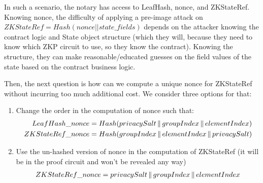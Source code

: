 In such a scenario, the notary has access to LeafHash, nonce, and ZKStateRef.
Knowing nonce, the difficulty of applying a pre-image attack on $ZKStateRef = Hash(nonce || state\_fields)$ depends on the attacker knowing the contract logic and State object structure (which they will, because they need to know which ZKP circuit to use, so they know the contract).
Knowing the structure, they can make reasonable/educated guesses on the field values of the state based on the contract business logic.

Then, the next question is how can we compute a unique nonce for ZKStateRef without incurring too much additional cost.
We consider three options for that:

\begin{enumerate}
\item Change the order in the computation of nonce such that: 
\begin{align}
LeafHash\_nonce &= Hash(privacySalt \operatorname{\mathbin\Vert} groupIndex \operatorname{\mathbin\Vert} elementIndex) \\
ZKStateRef\_nonce &= Hash(groupIndex \operatorname{\mathbin\Vert} elementIndex \operatorname{\mathbin\Vert} privacySalt)
\end{align}
\item Use the un-hashed version of nonce in the computation of ZKStateRef (it will be in the proof circuit and won't be revealed any way)
\begin{align}
ZKStateRef\_nonce = privacySalt \operatorname{\mathbin\Vert} groupIndex \operatorname{\mathbin\Vert} elementIndex
\end{align}
\end{enumerate}
























